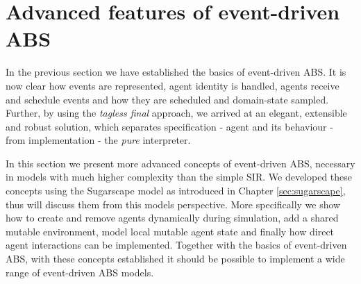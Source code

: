 \section{Advanced features of event-driven ABS}
In the previous section we have established the basics of event-driven ABS. It is now clear how events are represented, agent identity is handled, agents receive and schedule events and how they are scheduled and domain-state sampled. Further, by using the \textit{tagless final} approach, we arrived at an elegant, extensible and robust solution, which separates specification - agent and its behaviour - from implementation - the \textit{pure} interpreter. 

In this section we present more advanced concepts of event-driven ABS, necessary in models with much higher complexity than the simple SIR. We developed these concepts using the Sugarscape model as introduced in Chapter \ref{sec:sugarscape}, thus will discuss them from this models perspective. More specifically we show how to create and remove agents dynamically during simulation, add a shared mutable environment, model local mutable agent state and finally how direct agent interactions can be implemented. Together with the basics of event-driven ABS, with these concepts established it should be possible to implement a wide range of event-driven ABS models.









